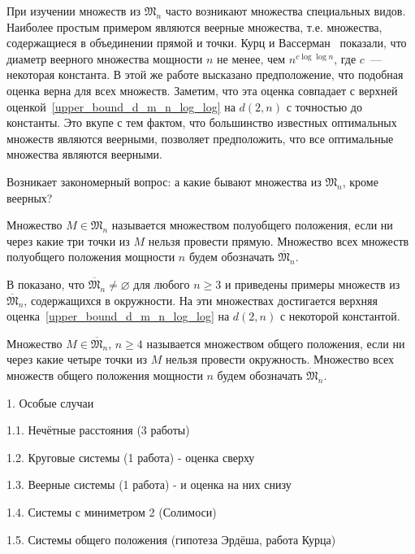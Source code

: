 При изучении множеств из $\mathfrak{M}_n$ часто возникают множества специальных видов.
Наиболее простым примером являются веерные множества, т.е. множества, содержащиеся в объединении прямой и точки.
Курц и Вассерман~\cite{kurz2008minimum} показали, что диаметр веерного множества мощности $n$
не менее, чем $n^{c \log \log n}$, где $c$~--- некоторая константа.
В этой же работе высказано предположение, что подобная оценка верна для всех множеств.
Заметим, что эта оценка совпадает с верхней оценкой~\eqref{upper_bound_d_m_n_log_log} на $d(2,n)$
с точностью до константы.
Это вкупе с тем фактом, что большинство известных оптимальных множеств являются веерными,
позволяет предположить, что все оптимальные множества являются веерными.

Возникает закономерный вопрос: а какие бывают множества из $\mathfrak{M}_n$,
кроме веерных?

\begin{definition}
	\cite{kurz2008minimum} Множество $M\in\mathfrak{M}_n$ называется множеством полуобщего положения,
	если ни через какие три точки из $M$ нельзя провести прямую.
	Множество всех множеств полуобщего положения мощности $n$ будем обозначать $\overline{\mathfrak{M}}_n$.
\end{definition}

В \cite{harborth1993upper} показано, что $\overline{\mathfrak{M}}_n\neq\varnothing$ для любого $n \geq 3$
и приведены примеры множеств из $\overline{\mathfrak{M}}_n$, содержащихся в окружности.
На эти множествах достигается верхняя оценка~\eqref{upper_bound_d_m_n_log_log} на $d(2,n)$
с некоторой константой.

\begin{definition}
	\cite{kurz2008minimum} Множество $M\in\overline{\mathfrak{M}}_n$, $n\geq 4$ называется множеством общего положения,
	если ни через какие четыре точки из $M$ нельзя провести окружность.
	Множество всех множеств общего положения мощности $n$ будем обозначать $\dot{\mathfrak{M}}_n$.
\end{definition}

1. Особые случаи

1.1. Нечётные расстояния (3 работы)

1.2. Круговые системы (1 работа) - оценка сверху

1.3. Веерные системы (1 работа) - и оценка на них снизу

1.4. Системы с миниметром 2 (Солимоси)

1.5. Системы общего положения (гипотеза Эрдёша, работа Курца)
\cite{kreisel2008heptagon}

